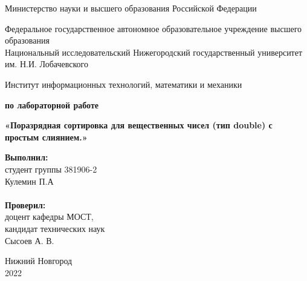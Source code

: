 \documentclass{report}
\begin{document}
\begin{titlepage}

\begin{center}
Министерство науки и высшего образования Российской Федерации
\end{center}

\begin{center}
Федеральное государственное автономное образовательное учреждение высшего образования \\
Национальный исследовательский Нижегородский государственный университет им. Н.И. Лобачевского
\end{center}

\begin{center}
Институт информационных технологий, математики и механики
\end{center}

\vspace{4em}

\begin{center}
\textbf{ по лабораторной работе} \\
\end{center}
\begin{center}
\textbf{\Large«Поразрядная сортировка для вещественных чисел (тип double) с простым слиянием.»} \\
\end{center}

\vspace{4em}

\newbox{\lbox}
\newlength{\maxl}
\setlength{\maxl}{\wd\lbox}
\hfill\parbox{7cm}{
\hspace*{5cm}\hspace*{-5cm}\textbf{Выполнил:} \\ студент группы 381906-2 \\ Кулемин П.А \\
\\
\hspace*{5cm}\hspace*{-5cm}\textbf{Проверил:}\\ доцент кафедры МОСТ, \\ кандидат технических наук \\ Сысоев А. В.\\
}
\vspace{\fill}

\begin{center} Нижний Новгород \\ 2022 \end{center}

\end{titlepage}
\end{document}
